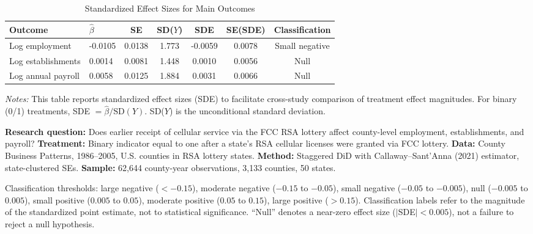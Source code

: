 \begin{table}[H]
\centering
\caption{Standardized Effect Sizes for Main Outcomes}
\label{tab:sde}
\begin{tabular}{llccccc}
\toprule
Outcome & $\hat{\beta}$ & SE & SD($Y$) & SDE & SE(SDE) & Classification \\
\midrule
Log employment & -0.0105 & 0.0138 & 1.773 & -0.0059 & 0.0078 & Small negative \\
Log establishments & 0.0014 & 0.0081 & 1.448 & 0.0010 & 0.0056 & Null \\
Log annual payroll & 0.0058 & 0.0125 & 1.884 & 0.0031 & 0.0066 & Null \\
\bottomrule
\end{tabular}
\par\vspace{0.3em}
{\footnotesize \emph{Notes:} This table reports standardized effect sizes (SDE) to facilitate cross-study comparison of treatment effect magnitudes. For binary (0/1) treatments, SDE $= \hat{\beta} / \text{SD}(Y)$. SD($Y$) is the unconditional standard deviation.

\textbf{Research question:} Does earlier receipt of cellular service via the FCC RSA lottery affect county-level employment, establishments, and payroll?
\textbf{Treatment:} Binary indicator equal to one after a state's RSA cellular licenses were granted via FCC lottery.
\textbf{Data:} County Business Patterns, 1986--2005, U.S. counties in RSA lottery states.
\textbf{Method:} Staggered DiD with Callaway--Sant'Anna (2021) estimator, state-clustered SEs.
\textbf{Sample:} 62,644 county-year observations, 3,133 counties, 50 states.

Classification thresholds: large negative ($< -0.15$), moderate negative ($-0.15$ to $-0.05$), small negative ($-0.05$ to $-0.005$), null ($-0.005$ to $0.005$), small positive ($0.005$ to $0.05$), moderate positive ($0.05$ to $0.15$), large positive ($> 0.15$). Classification labels refer to the magnitude of the standardized point estimate, not to statistical significance. ``Null'' denotes a near-zero effect size ($|$SDE$| < 0.005$), not a failure to reject a null hypothesis.}
\end{table}
